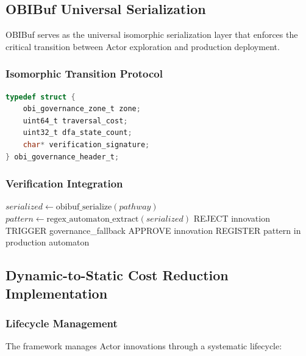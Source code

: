 \documentclass[12pt,a4paper]{article}
\begin{document}
\subsection{OBIBuf Universal Serialization}

OBIBuf serves as the universal isomorphic serialization layer that enforces the critical transition between Actor exploration and production deployment.

\subsubsection{Isomorphic Transition Protocol}

\begin{lstlisting}[language=C, caption=OBIBuf Serialization Protocol]
typedef struct {
    obi_governance_zone_t zone;
    uint64_t traversal_cost;
    uint32_t dfa_state_count;
    char* verification_signature;
} obi_governance_header_t;
\end{lstlisting}

\subsubsection{Verification Integration}

\begin{algorithm}
\caption{OBIBuf Verification Protocol}
\begin{algorithmic}[1]
    \State $serialized \gets \text{obibuf\_serialize}(pathway)$
    \State $pattern \gets \text{regex\_automaton\_extract}(serialized)$
        \State \textsc{REJECT} innovation
        \State \textsc{TRIGGER} governance\_fallback
    \Else
        \State \textsc{APPROVE} innovation
        \State \textsc{REGISTER} pattern in production automaton
    \EndIf
\EndFor
\end{algorithmic}
\end{algorithm}

\subsection{Dynamic-to-Static Cost Reduction Implementation}

\subsubsection{Lifecycle Management}

The framework manages Actor innovations through a systematic lifecycle:
\end{document}
